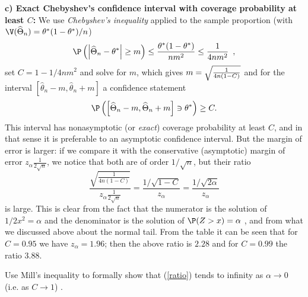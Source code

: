 \textbf{c) Exact Chebyshev's confidence interval with coverage probability at least $C$: } We use \textit{Chebyshev's inequality} applied to the sample
proportion (with $\V(\widehat{\Theta}_{n})=\theta^*(1-\theta^*)/n$) 
\begin{equation*}
\P \left( \left\vert \widehat{\Theta}_{n}-\theta^*\right\vert \geq m\right) \leq \frac{%
\theta^*(1-\theta^*)}{nm^{2}}\leq \frac{1}{4nm^{2}}\enspace ,
\end{equation*}%
set $C=1-1/4nm^{2}$ and solve for $m$, which gives $m=\sqrt{\frac{1}{%
4n(1-C)}}$ and for the interval $\left[ \widehat{\theta}_{n}-m,\widehat{\theta}_{n}+m\right] $
a confidence statement 
\begin{equation*}
\P \left( \left[ \widehat{\Theta}_{n}-m,\widehat{\Theta}_{n}+m\right] \ni \theta^* \right) \geq C.
\end{equation*}%
This interval has nonasymptotic (or \textit{exact}) coverage probability at
least $C$, and in that sense it is preferable to an asymptotic confidence
interval. But the margin of error is larger: if we compare it with the
conservative (asymptotic) margin of error $z_{\alpha}\frac{1}{2%
\sqrt{n}}$, we notice that both are of order $1/\sqrt{n}$, but their ratio 
\begin{equation}
\frac{\sqrt{\frac{1}{4n(1-C)}}}{z_{\alpha}\frac{1}{2\sqrt{n}}}=%
\frac{1/\sqrt{1-C}}{z_{\alpha}}=\frac{1/\sqrt{2\alpha }}{z_{\alpha}}  \label{ratio}
\end{equation}%
is large. This is clear from the fact that the numerator is the solution of $%
1/2x^{2}=\alpha $ and the denominator is the solution of $\P (Z>x)=\alpha $%
, and from what we discussed above about the normal tail. From the table it
can be seen that for $C=0.95$ we have $z_{\alpha}=1.96$; then the
above ratio is $2.28$ and for $C=0.99$ the ratio $3.88.$\bigskip

\begin{Exercise}
Use Mill's inequality to formally show that (\ref{ratio})
tends to infinity as $\alpha \rightarrow 0$ (i.e. as $C\rightarrow 1$) .
\end{Exercise}

